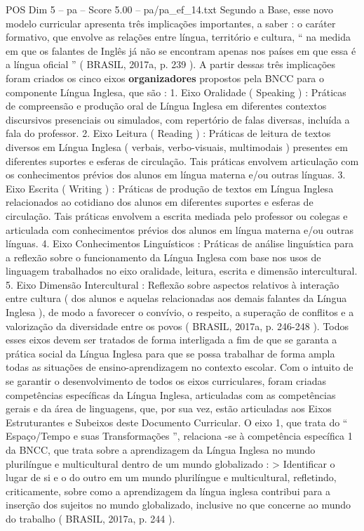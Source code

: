 \begin{textsample}{POS Dim 5 – pa – Score 5.00 – pa/pa\_ef\_14.txt}
Segundo a Base, esse novo modelo curricular apresenta três implicações importantes, a saber : o caráter formativo, que envolve as relações entre língua, território e cultura, “ na medida em que os falantes de Inglês já não se encontram apenas nos países em que essa é a língua oficial ” ( BRASIL, 2017a, p. 239 ).
A partir dessas três implicações foram criados os cinco eixos \textbf{organizadores} propostos pela BNCC para o componente Língua Inglesa, que são : 1.
Eixo Oralidade ( Speaking ) : Práticas de compreensão e produção oral de Língua Inglesa em diferentes contextos discursivos presenciais ou simulados, com repertório de falas diversas, incluída a fala do professor. 2.
Eixo Leitura ( Reading ) : Práticas de leitura de textos diversos em Língua Inglesa ( verbais, verbo-visuais, multimodais ) presentes em diferentes suportes e esferas de circulação.
Tais práticas envolvem articulação com os conhecimentos prévios dos alunos em língua materna e/ou outras línguas. 3.
Eixo Escrita ( Writing ) : Práticas de produção de textos em Língua Inglesa relacionados ao cotidiano dos alunos em diferentes suportes e esferas de circulação.
Tais práticas envolvem a escrita mediada pelo professor ou colegas e articulada com conhecimentos prévios dos alunos em língua materna e/ou outras línguas. 4.
Eixo Conhecimentos Linguísticos : Práticas de análise linguística para a reflexão sobre o funcionamento da Língua Inglesa com base nos usos de linguagem trabalhados no eixo oralidade, leitura, escrita e dimensão intercultural. 5.
Eixo Dimensão Intercultural : Reflexão sobre aspectos relativos à interação entre cultura ( dos alunos e aquelas relacionadas aos demais falantes da Língua Inglesa ), de modo a favorecer o convívio, o respeito, a superação de conflitos e a valorização da diversidade entre os povos ( BRASIL, 2017a, p. 246-248 ).
Todos esses eixos devem ser tratados de forma interligada a fim de que se garanta a prática social da Língua Inglesa para que se possa trabalhar de forma ampla todas as situações de ensino-aprendizagem no contexto escolar.
Com o intuito de se garantir o desenvolvimento de todos os eixos curriculares, foram criadas competências específicas da Língua Inglesa, articuladas com as competências gerais e da área de linguagens, que, por sua vez, estão articuladas aos Eixos Estruturantes e Subeixos deste Documento Curricular.
O eixo 1, que trata do “ Espaço/Tempo e suas Transformações ”, relaciona -se à competência específica 1 da BNCC, que trata sobre a aprendizagem da Língua Inglesa no mundo plurilíngue e multicultural dentro de um mundo globalizado : > Identificar o lugar de si e o do outro em um mundo plurilíngue e multicultural, refletindo, criticamente, sobre como a aprendizagem da língua inglesa contribui para a inserção dos sujeitos no mundo globalizado, inclusive no que concerne ao mundo do trabalho ( BRASIL, 2017a, p. 244 ).

\end{textsample}
